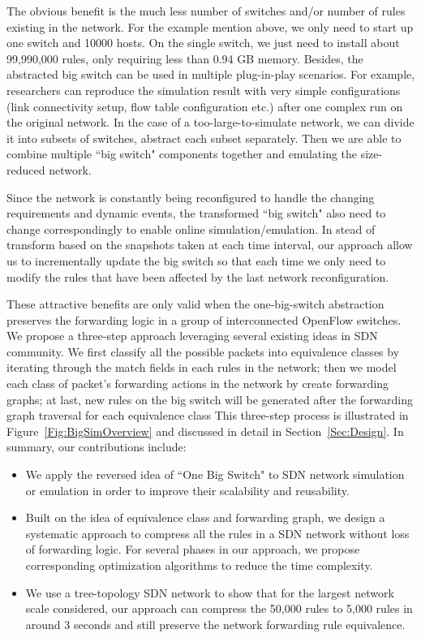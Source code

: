 The obvious benefit is the much less number of switches and/or number of rules existing in the network.
For the example mention above, we only need to start up one switch and 10000 hosts.
On the single switch, we just need to install about 99,990,000 rules, only requiring less than 0.94 GB memory.
Besides, the abstracted big switch can be used in multiple plug-in-play scenarios.
For example, researchers can reproduce the simulation result with very
simple configurations (link connectivity setup, flow table configuration etc.)
after one complex run on the original network.
In the case of a too-large-to-simulate network, we can divide it into subsets of switches,
abstract each subset separately.
Then we are able to combine multiple ``big switch" components together
and emulating the size-reduced network.

Since the network is constantly being reconfigured to handle the changing requirements and dynamic events, the transformed ``big switch" also need to change correspondingly to enable online simulation/emulation. In stead of transform based on the snapshots taken at each time interval, our approach allow us to incrementally update the big switch so that each time we only need to modify the rules that have been affected by the last network reconfiguration. 

These attractive benefits are only valid when the one-big-switch abstraction preserves
the forwarding logic in a group of interconnected OpenFlow switches.
We propose a three-step approach leveraging several existing ideas in SDN community.
We first classify all the possible packets into equivalence classes by iterating through
the match fields in each rules in the network;
then we model each class of packet's forwarding actions in the network
by create forwarding graphs;
at last, new rules on the big switch will be generated after the 
forwarding graph traversal for each equivalence class
This three-step process is illustrated in Figure~\ref{Fig:BigSimOverview} and discussed
in detail in Section~\ref{Sec:Design}.
In summary, our contributions include:
\begin{itemize}
\item We apply the reversed idea of ``One Big Switch"\cite{OneBigSwitchAbstraction}
        to SDN network simulation or emulation in order to
        improve their scalability and reusability.
\item Built on the idea of equivalence class and forwarding graph, we design
        a systematic approach to compress all the rules in a SDN network without
        loss of forwarding logic.
        For several phases in our approach, we propose corresponding optimization
        algorithms to reduce the time complexity.
\item We use a tree-topology SDN network to show that for the largest network scale
        considered, our approach can compress the 50,000 rules to 5,000 rules in
        around 3 seconds and still preserve the network forwarding rule equivalence.
\end{itemize}

